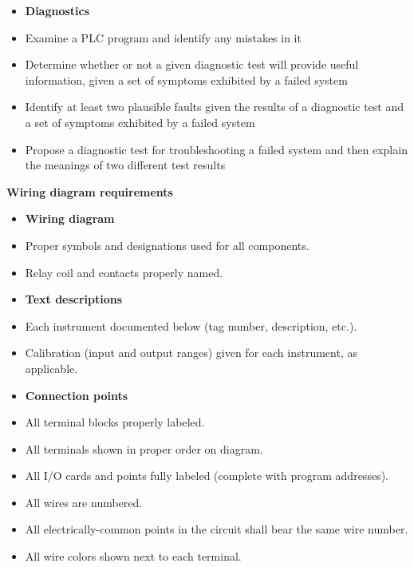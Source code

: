 \filbreak

\begin{itemize}
\item{} {\bf Diagnostics}
\item{} Examine a PLC program and identify any mistakes in it
\item{} Determine whether or not a given diagnostic test will provide useful information, given a set of symptoms exhibited by a failed system
\item{} Identify at least two plausible faults given the results of a diagnostic test and a set of symptoms exhibited by a failed system
\item{} Propose a diagnostic test for troubleshooting a failed system and then explain the meanings of two different test results
\end{itemize}


\vfil \eject

\noindent
{\bf Wiring diagram requirements}

\begin{itemize}
\item{} {\bf Wiring diagram}
\item{} Proper symbols and designations used for all components.
\item{} Relay coil and contacts properly named.
\end{itemize}

\begin{itemize}
\item{} {\bf Text descriptions}
\item{} Each instrument documented below (tag number, description, etc.).
\item{} Calibration (input and output ranges) given for each instrument, as applicable.
\end{itemize}

\begin{itemize}
\item{} {\bf Connection points}
\item{} All terminal blocks properly labeled.
\item{} All terminals shown in proper order on diagram.
\item{} All I/O cards and points fully labeled (complete with program addresses).
\item{} All wires are numbered.
\item{} All electrically-common points in the circuit shall bear the same wire number.
\item{} All wire colors shown next to each terminal.
\end{itemize}


